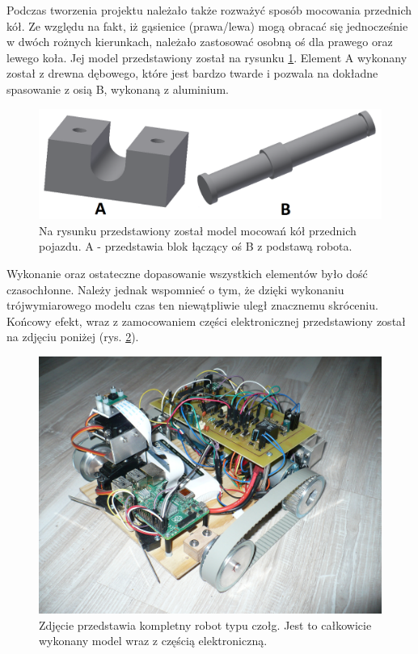 Podczas tworzenia projektu należało także rozważyć sposób mocowania przednich kół. Ze względu na fakt, iż gąsienice (prawa/lewa) mogą obracać się jednocześnie w dwóch rożnych kierunkach, należało zastosować osobną oś dla prawego oraz lewego koła. Jej model przedstawiony został na rysunku \ref{zamocowanie_przod}. Element A wykonany został z drewna dębowego, które jest bardzo twarde i pozwala na dokładne spasowanie z osią B, wykonaną z aluminium.

  \begin{figure}[H]
    \begin{center}
      \includegraphics[scale=0.40]{imgs/moc_kol_prz.png}
 	\caption[Model mocowania kół przednich.]{\small{Na rysunku przedstawiony został model mocowań kół przednich pojazdu. A - przedstawia blok łączący oś B z podstawą robota.}}
	\label{zamocowanie_przod}
    \end{center}
  \end{figure}
  \newpage
{}
Wykonanie oraz ostateczne dopasowanie wszystkich elementów było dość czasochłonne. Należy jednak wspomnieć o tym, że dzięki wykonaniu trójwymiarowego modelu czas ten niewątpliwie uległ znacznemu skróceniu. Końcowy efekt, wraz z zamocowaniem części elektronicznej przedstawiony został na zdjęciu poniżej (rys. \ref{czolg_calosc}).
  \begin{figure}[H]
    \begin{center}
      \includegraphics[scale=0.13]{imgs/czolg.jpg}
 	\caption[Zbudowany model.]{\small{Zdjęcie przedstawia kompletny robot typu czołg. Jest to całkowicie wykonany model wraz z częścią elektroniczną.}}
	\label{czolg_calosc}
    \end{center}
  \end{figure}
